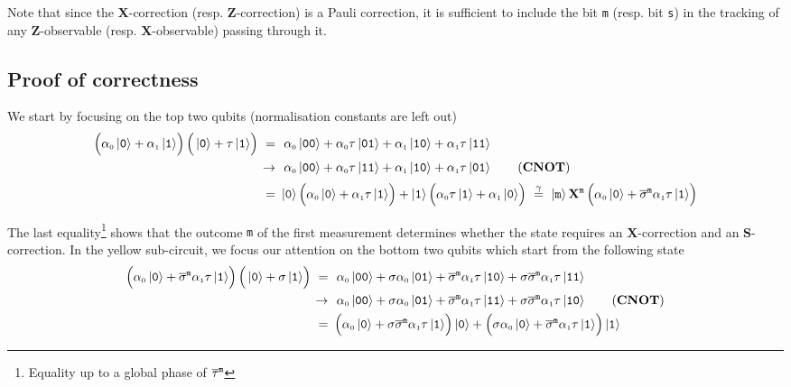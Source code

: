 \documentclass{article}
\newcommand{\parentheses}[1]{\left(\vphantom{\sum}#1\right)}
\newcommand{\sub}[1]{_{\scriptscriptstyle #1}}
\newcommand{\Op}[1]{{\bf #1}}
\newcommand{\kett}[1]{\ket{\mbox{\tt #1}}}
\begin{document}
	Note that since the \Op{X}-correction (resp. \Op{Z}-correction) is a Pauli correction, it is sufficient to include the bit {\tt m} (resp. bit {\tt s}) in the tracking of any \Op{Z}-observable (resp. \Op{X}-observable) passing through it.

	\subsection{Proof of correctness}

	We start by focusing on the top two qubits (normalisation constants are left out)
	\begin{align*}
		\parentheses{\alpha\sub{0}\kett{0} + \alpha\sub{1}\kett{1}}\parentheses{\kett{0}+\tau\kett{1}}
		~=&~~ \alpha\sub{0}\kett{00} + \alpha\sub{0}\tau\kett{01} + \alpha\sub{1}\kett{10} + \alpha\sub{1}\tau\kett{11} \\
		~\rightarrow&~~
			\alpha\sub{0}\kett{00} + \alpha\sub{0}\tau\kett{11} + \alpha\sub{1}\kett{10} + \alpha\sub{1}\tau\kett{01}
		\tag{\Op{CNOT}} \\[2pt]
		~=&~ \kett{0}\parentheses{\alpha\sub{0}\kett{0} + \alpha\sub{1}\tau\kett{1}} + 
			\kett{1}\parentheses{\alpha\sub{0}\tau\kett{1} + \alpha\sub{1}\kett{0}}
		~\overset{\gamma}{=}~
			\kett{m}\Op{X}^{\tt m}\parentheses{\alpha\sub{0}\kett{0} + \overline{\sigma}^{\tt m}\alpha\sub{1}\tau\kett{1}}
	\end{align*}

	The last equality\footnote{Equality up to a global phase of $\overline{\tau}^{\tt m}$} shows that the outcome {\tt m} of the  first measurement determines whether the state requires an \Op{X}-correction and an \Op{S}-correction. In the yellow sub-circuit, we focus our attention on the bottom two qubits which start from the following state
	\begin{align*}
		\parentheses{\alpha\sub{0}\kett{0} + \overline{\sigma}^{\tt m}\alpha\sub{1}\tau\kett{1}}
			\parentheses{\kett{0} + \sigma\kett{1}}
		~=&~~
			\alpha\sub{0}\kett{00} + \sigma\alpha\sub{0}\kett{01} + \overline{\sigma}^{\tt m}\alpha\sub{1}\tau\kett{10} + \sigma\overline{\sigma}^{\tt m}\alpha\sub{1}\tau\kett{11}
		\\
		~\rightarrow&~~
			\alpha\sub{0}\kett{00} + \sigma\alpha\sub{0}\kett{01} + \overline{\sigma}^{\tt m}\alpha\sub{1}\tau\kett{11} + \sigma\overline{\sigma}^{\tt m}\alpha\sub{1}\tau\kett{10}
		\tag{\Op{CNOT}}
		\\
		~=&~ \parentheses{\alpha\sub{0}\kett{0} + \sigma\overline{\sigma}^{\tt m}\alpha\sub{1}\tau\kett{1}}\kett{0}
			+ \parentheses{\sigma\alpha\sub{0}\kett{0} + \overline{\sigma}^{\tt m}\alpha\sub{1}\tau\kett{1}}\kett{1}
	\end{align*}
\end{document}
